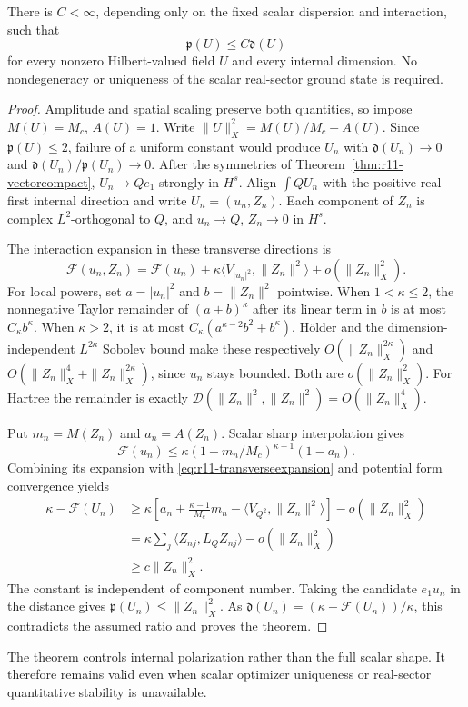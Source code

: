 \begin{theorem}
\label{thm:r11-quantitativepolarization}
There is $C<\infty$, depending only on the fixed scalar dispersion
and interaction, such that
\begin{equation}\label{eq:r11-polarizationdeficit}
 \mathfrak p(U)\le C\mathfrak d(U)
\end{equation}
for every nonzero Hilbert-valued field $U$ and every internal dimension.
No nondegeneracy or uniqueness of the scalar real-sector ground state
is required.
\end{theorem}
\begin{proof}
Amplitude and spatial scaling preserve both quantities, so impose
$M(U)=M_c$, $A(U)=1$. Write
$\|U\|_X^2=M(U)/M_c+A(U)$.
Since $\mathfrak p(U)\le2$, failure of a uniform constant would
produce $U_n$ with $\mathfrak d(U_n)\to0$ and
$\mathfrak d(U_n)/\mathfrak p(U_n)\to0$.
After the symmetries of Theorem~\ref{thm:r11-vectorcompact},
$U_n\to Qe_1$ strongly in $H^s$.
Align $\int QU_n$ with the positive real first internal direction
and write $U_n=(u_n,Z_n)$. Each component of $Z_n$ is complex
$L^2$-orthogonal to $Q$, and $u_n\to Q$, $Z_n\to0$ in $H^s$.

The interaction expansion in these transverse directions is
\begin{equation}\label{eq:r11-transverseexpansion}
 \mathcal F(u_n,Z_n)=\mathcal F(u_n)
 +\kappa\langle V_{|u_n|^2},\|Z_n\|^2\rangle
 +o(\|Z_n\|_X^2).
\end{equation}
For local powers, set $a=|u_n|^2$ and $b=\|Z_n\|^2$ pointwise.
When $1<\kappa\le2$, the nonnegative Taylor remainder of
$(a+b)^\kappa$ after its linear term in $b$ is at most $C_\kappa b^\kappa$.
When $\kappa>2$, it is at most
$C_\kappa(a^{\kappa-2}b^2+b^\kappa)$.
H\"older and the dimension-independent $L^{2\kappa}$ Sobolev bound
make these respectively $O(\|Z_n\|_X^{2\kappa})$ and
$O(\|Z_n\|_X^4+\|Z_n\|_X^{2\kappa})$, since $u_n$ stays bounded.
Both are $o(\|Z_n\|_X^2)$.
For Hartree the remainder is exactly
$\mathcal D(\|Z_n\|^2,\|Z_n\|^2)=O(\|Z_n\|_X^4)$.

Put $m_n=M(Z_n)$ and $a_n=A(Z_n)$. Scalar sharp interpolation gives
\[
 \mathcal F(u_n)\le
 \kappa(1-m_n/M_c)^{\kappa-1}(1-a_n).
\]
Combining its expansion with \eqref{eq:r11-transverseexpansion}
and potential form convergence yields
\begin{align*}
 \kappa-\mathcal F(U_n)
 &\ge\kappa\left[
 a_n+\frac{\kappa-1}{M_c}m_n
       -\langle V_{Q^2},\|Z_n\|^2\rangle\right]
       -o(\|Z_n\|_X^2)\\
 &=\kappa\sum_j\langle Z_{nj},L_QZ_{nj}\rangle
       -o(\|Z_n\|_X^2)\\
 &\ge c\|Z_n\|_X^2.
\end{align*}
The constant is independent of component number. Taking the candidate
$e_1u_n$ in the distance gives
$\mathfrak p(U_n)\le\|Z_n\|_X^2$.
As $\mathfrak d(U_n)=(\kappa-\mathcal F(U_n))/\kappa$,
this contradicts the assumed ratio and proves the theorem.
\end{proof}

The theorem controls internal polarization rather than the full
scalar shape. It therefore remains valid even when scalar optimizer
uniqueness or real-sector quantitative stability is unavailable.

